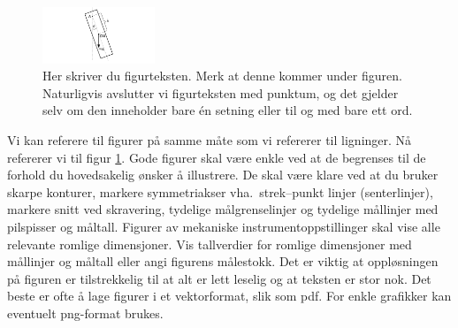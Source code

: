 \documentclass[5p]{elsarticle}
\begin{document}

\begin{figure}[htb] 
  \begin{center}
      \includegraphics[width=0.3\textwidth]{pendel}  %
  \end{center}
  \caption{Her skriver du figurteksten. Merk at denne kommer under figuren. Naturligvis avslutter vi figurteksten med punktum,
  og det gjelder selv om den inneholder bare én setning eller til og med bare ett ord.}
  \label{MinLilleFigur} %
\end{figure}

Vi kan referere til figurer på samme måte som vi refererer til ligninger. Nå refererer vi til 
figur \ref{MinLilleFigur}. Gode figurer skal være enkle ved at de begrenses til de forhold du
hovedsakelig ønsker å illustrere. De skal være klare ved at du bruker skarpe konturer, markere
symmetriakser vha.\ strek--punkt linjer (senterlinjer), markere snitt ved skravering, tydelige
målgrenselinjer og tydelige mållinjer med pilspisser og måltall. 
Figurer av mekaniske instrumentoppstillinger skal vise alle relevante romlige dimensjoner.
Vis tallverdier for romlige dimensjoner med mållinjer og måltall eller angi figurens målestokk.
Det er viktig at oppløsningen på figuren er tilstrekkelig til at alt er lett leselig og at teksten er stor nok.
Det beste er ofte å lage figurer i et vektorformat, slik som pdf. For enkle grafikker kan eventuelt png-format brukes.
\end{document}
